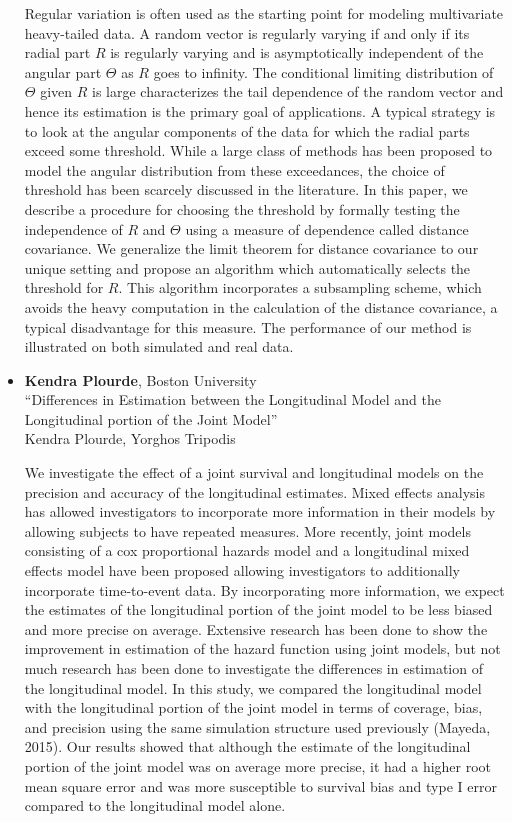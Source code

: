 \begin{itemize}
Regular variation is often used as the starting point for modeling multivariate heavy-tailed data. A random vector is regularly varying if and only if its radial part $R$ is regularly varying and is asymptotically independent of the angular part $\Theta$ as $R$ goes to infinity. The conditional limiting distribution of $\Theta$ given $R$ is large characterizes the tail dependence of the random vector and hence its estimation is the primary goal of applications. A typical strategy is to look at the angular components of the data for which the radial parts exceed some threshold. While a large class of methods has been proposed to model the angular distribution from these exceedances, the choice of threshold has been scarcely discussed in the literature. In this paper, we describe a procedure for choosing the threshold by formally testing the independence of $R$ and $\Theta$ using a measure of dependence called distance covariance. We generalize the limit theorem for distance covariance to our unique setting and propose an algorithm which automatically selects the threshold for $R$. This algorithm incorporates a subsampling scheme, which avoids the heavy computation in the calculation of the distance covariance, a typical disadvantage for this measure. The performance of our method is illustrated on both simulated and real data.

\item \textbf{Kendra Plourde}, Boston University \\
``Differences in Estimation between the Longitudinal Model and the Longitudinal portion of the Joint Model'' \\
Kendra Plourde, Yorghos Tripodis


We investigate the effect of a joint survival and longitudinal models on the precision and accuracy of the longitudinal estimates. Mixed effects analysis has allowed investigators to incorporate more information in their models by allowing subjects to have repeated measures. More recently, joint models consisting of a cox proportional hazards model and a longitudinal mixed effects model have been proposed allowing investigators to additionally incorporate time-to-event data. By incorporating more information, we expect the estimates of the longitudinal portion of the joint model to be less biased and more precise on average. Extensive research has been done to show the improvement in estimation of the hazard function using joint models, but not much research has been done to investigate the differences in estimation of the longitudinal model. In this study, we compared the longitudinal model with the longitudinal portion of the joint model in terms of coverage, bias, and precision using the same simulation structure used previously (Mayeda, 2015). Our results showed that although the estimate of the longitudinal portion of the joint model was on average more precise, it had a higher root mean square error and was more susceptible to survival bias and type I error compared to the longitudinal model alone.


\end{itemize}
